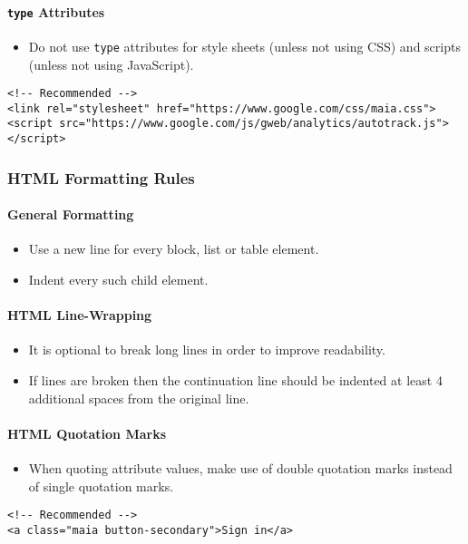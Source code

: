 \documentclass[a4paper, 11pt]{article}
\begin{document}
\paragraph{\texttt{type} Attributes}
\begin{itemize}
\item Do not use \texttt{type} attributes for style sheets (unless not using CSS) and scripts (unless not using JavaScript).
\end{itemize}
\begin{verbatim}
<!-- Recommended -->
<link rel="stylesheet" href="https://www.google.com/css/maia.css">
<script src="https://www.google.com/js/gweb/analytics/autotrack.js"></script>
\end{verbatim}

\subsubsection{HTML Formatting Rules}

\paragraph{General Formatting}
\begin{itemize}
\item Use a new line for every block, list or table element.
\item Indent every such child element.
\end{itemize}

\paragraph{HTML Line-Wrapping}
\begin{itemize}
\item It is optional to break long lines in order to improve readability.
\item If lines are broken then the continuation line should be indented at least 4 additional spaces from the original line.
\end{itemize}

\paragraph{HTML Quotation Marks}
\begin{itemize}
\item When quoting attribute values, make use of double quotation marks instead of single quotation marks.
\end{itemize}
\begin{verbatim}
<!-- Recommended -->
<a class="maia button-secondary">Sign in</a>
\end{verbatim}
\end{document}
